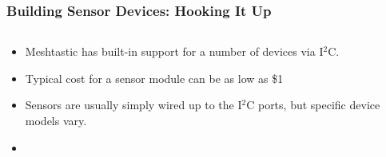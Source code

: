 \documentclass[aspectratio=169]{beamer}
\begin{document}
\begin{frame}[fragile]
  \frametitle{Building Sensor Devices: Hooking It Up}
  \begin{columns}[]
    \begin{column}[T]{0.45\paperwidth}
      \begin{itemize}
        \item{Meshtastic has built-in support for a number of devices via I$^2$C.}
        \item{Typical cost for a sensor module can be as low as \$1}
        \item{Sensors are usually simply wired up to the I$^2$C ports, but specific device models vary.}
        \item{\color{red}{BME280 Sensor for Temperature, Humidity, Air Pressure}}
      \end{itemize}
    \end{column}
    \begin{column}[T]{0.45\paperwidth}
    \end{column}
  \end{columns}
\end{frame}
\end{document}
